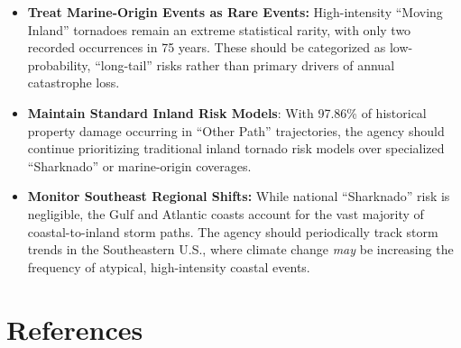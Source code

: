 \documentclass[
  letterpaper,
  DIV=11,
  numbers=noendperiod]{scrreprt}
\providecommand{\tightlist}{%
  \setlength{\itemsep}{0pt}\setlength{\parskip}{0pt}}
\begin{document}
\begin{tcolorbox}[enhanced jigsaw, bottomrule=.15mm, colframe=quarto-callout-tip-color-frame, colback=white, opacityback=0, toptitle=1mm, leftrule=.75mm, arc=.35mm, title=\textcolor{quarto-callout-tip-color}{\faLightbulb}\hspace{0.5em}{Action Items}, bottomtitle=1mm, colbacktitle=quarto-callout-tip-color!10!white, coltitle=black, breakable, titlerule=0mm, opacitybacktitle=0.6, rightrule=.15mm, toprule=.15mm, left=2mm]

\begin{itemize}
\tightlist
\item
  \textbf{Treat Marine-Origin Events as Rare Events:} High-intensity
  ``Moving Inland'' tornadoes remain an extreme statistical rarity, with
  only two recorded occurrences in 75 years. These should be categorized
  as low-probability, ``long-tail'' risks rather than primary drivers of
  annual catastrophe loss.
\item
  \textbf{Maintain Standard Inland Risk Models}: With 97.86\% of
  historical property damage occurring in ``Other Path'' trajectories,
  the agency should continue prioritizing traditional inland tornado
  risk models over specialized ``Sharknado'' or marine-origin coverages.
\item
  \textbf{Monitor Southeast Regional Shifts:} While national
  ``Sharknado'' risk is negligible, the Gulf and Atlantic coasts account
  for the vast majority of coastal-to-inland storm paths. The agency
  should periodically track storm trends in the Southeastern U.S., where
  climate change \emph{may} be increasing the frequency of atypical,
  high-intensity coastal events.
\end{itemize}

\end{tcolorbox}


\chapter*{References}\label{references}

\end{document}
